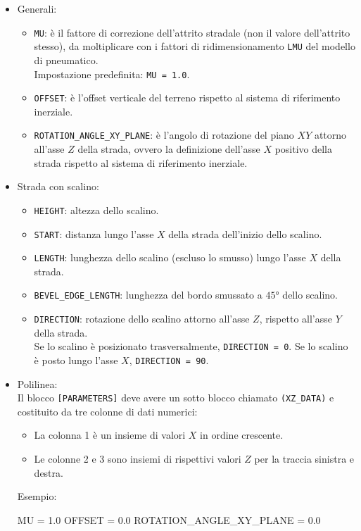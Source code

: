 \begin{itemize}
	\item Generali:
	\begin{itemize}
		\item \texttt{MU}: è il fattore di correzione dell'attrito stradale (non il valore dell'attrito stesso), da moltiplicare con i fattori di ridimensionamento \texttt{LMU} del modello di pneumatico.\\
		Impostazione predefinita: \texttt{MU = 1.0}.
		\item \texttt{OFFSET}: è l'offset verticale del terreno rispetto al sistema di riferimento inerziale.
		\item \texttt{ROTATION\_ANGLE\_XY\_PLANE}: è l'angolo di rotazione del piano $XY$ attorno all'asse $Z$ della strada, ovvero la definizione dell'asse $X$ positivo della strada rispetto al sistema di riferimento inerziale.
	\end{itemize}
	\item Strada con scalino:
	\begin{itemize}
		\item \texttt{HEIGHT}: altezza dello scalino.
		\item \texttt{START}: distanza lungo l'asse $X$ della strada dell'inizio dello scalino.
		\item \texttt{LENGTH}: lunghezza dello scalino (escluso lo smusso) lungo l'asse $X$ della strada.
		\item \texttt{BEVEL\_EDGE\_LENGTH}: lunghezza del bordo smussato a $45°$ dello scalino.
		\item \texttt{DIRECTION}: rotazione dello scalino attorno all'asse $Z$, rispetto all'asse $Y$ della strada.\\
		Se lo scalino è posizionato trasversalmente, \texttt{DIRECTION = 0}. Se lo scalino è posto lungo l'asse $X$, \texttt{DIRECTION = 90}.
	\end{itemize}
	\item Polilinea:\\
	Il blocco \texttt{[PARAMETERS]} deve avere un sotto blocco chiamato \texttt{(XZ\_DATA)} e costituito da tre colonne di dati numerici:
	\begin{itemize}
		\item La colonna 1 è un insieme di valori $X$ in ordine crescente.
		\item Le colonne 2 e 3 sono insiemi di rispettivi valori $Z$ per la traccia sinistra e destra.
	\end{itemize}
	Esempio:
	\begin{pseudoc}
	[PARAMETERS]
	MU = 1.0
	OFFSET = 0.0
	ROTATION_ANGLE_XY_PLANE = 0.0 
	

\end{pseudoc}
\end{itemize}
